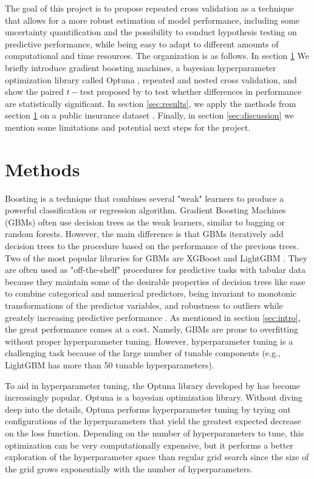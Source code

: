 \documentclass[11pt,a4paper]{article}
\theoremstyle{plain}
\theoremstyle{definition}
\begin{document}
The goal of this project is to propose repeated cross validation as a technique that allows for a more robust estimation of model performance, including some uncertainty quantification and the possibility to conduct hypothesis testing on predictive performance, while being easy to adapt to different amounts of computational and time resources. The organization is as follows. In section \ref{sec:methods} We briefly introduce gradient boosting machines, a bayesian hyperparameter optimization library called Optuna \citep{optuna}, repeated and nested cross validation, and show the paired $t-$test proposed by \cite{ttest} to test whether differences in performance are statistically significant. In section \ref{sec:results}, we apply the methods from section \ref{sec:methods} on a public insurance dataset \citep{allstate-claims-severity}. Finally, in section \ref{sec:discussion} we mention some limitations and potential next steps for the project.

\section{Methods}
\label{sec:methods}

Boosting is a technique that combines several "weak" learners to produce a powerful classification or regression algorithm. Gradient Boosting Machines (GBMs) often use decision trees as the weak learners, similar to bagging or random forests. However, the main difference is that GBMs iteratively add decision trees to the procedure based on the performance of the previous trees. Two of the most popular libraries for GBMs are XGBoost \citep{xgboost} and LightGBM \citep{lightgbm}. They are often used as "off-the-shelf" procedures for predictive tasks with tabular data because they maintain some of the desirable properties of decision trees like ease to combine categorical and numerical predictors, being invariant to monotonic transformations of the predictor variables, and robustness to outliers while greately increasing predictive performance \citep{esl}. As mentioned in section \ref{sec:intro}, the great performance comes at a cost. Namely, GBMs are prone to overfitting without proper hyperparameter tuning. However, hyperparameter tuning is a challenging task because of the large number of tunable components (e.g., LightGBM has more than 50 tunable hyperparameters).

To aid in hyperparameter tuning, the Optuna library developed by \citet{optuna} has become increasingly popular. Optuna is a bayesian optimization library. Without diving deep into the details, Optuna performs hyperparameter tuning by trying out configurations of the hyperparameters that yield the greatest expected decrease on the loss function. Depending on the number of hyperparameters to tune, this optimization can be very computationally expensive, but it performs a better exploration of the hyperparameter space than regular grid search since the size of the grid grows exponentially with the number of hyperparameters.
\end{document}
